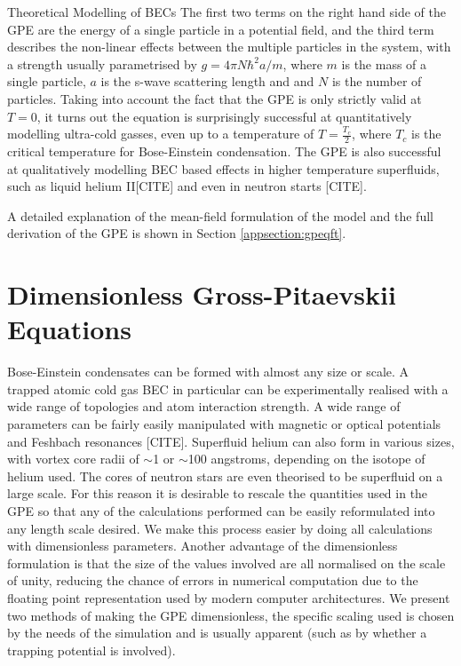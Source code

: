 \begin{chapter}{\label{cha:theoretical_model}Theoretical Modelling of BECs}
The first two terms on the right hand side of the GPE are the energy of a single particle in a potential field, and the third term describes the non-linear effects between the multiple particles in the system, with a strength usually parametrised by $g=4\pi N \hbar^2a/m$,
where $m$ is the mass of a single particle, $a$ is the s-wave scattering length and and $N$ is the number of particles.
Taking into account the fact that the GPE is only strictly valid at $T=0$, it turns out the equation is surprisingly successful at quantitatively modelling ultra-cold gasses, even up to a temperature of $T=\frac{T_c}{2}$, where $T_c$ is the critical temperature for Bose-Einstein condensation. The GPE is also successful at qualitatively modelling BEC based effects in higher temperature superfluids, such as liquid helium II[CITE] and even in neutron starts [CITE].

A detailed explanation of the mean-field formulation of the model and the full derivation of the GPE is shown in Section \ref{appsection:gpeqft}.

\section{\label{section:gpedimless} Dimensionless Gross-Pitaevskii Equations}
	Bose-Einstein condensates can be formed with almost any size or scale. A trapped atomic cold gas BEC in particular can be experimentally realised with a wide range of topologies and atom interaction strength. A wide range of parameters can be fairly easily manipulated with magnetic or optical potentials and Feshbach resonances [CITE]. Superfluid helium can also form in various sizes, with vortex core radii of $\sim$1 or $\sim$100 angstroms, depending on the isotope of helium used. The cores of neutron stars are even theorised to be superfluid on a large scale. For this reason it is desirable to rescale the quantities used in the GPE so that any of the calculations performed can be easily reformulated into any length scale desired. We make this process easier by doing all calculations with dimensionless parameters. Another advantage of the dimensionless formulation is that the size of the values involved are all normalised on the scale of unity, reducing the chance of errors in numerical computation due to the floating point representation used by modern computer architectures.
	We present two methods of making the GPE dimensionless, the specific scaling used is chosen by the needs of the simulation and is usually apparent (such as by whether a trapping potential is involved).


\end{chapter}
